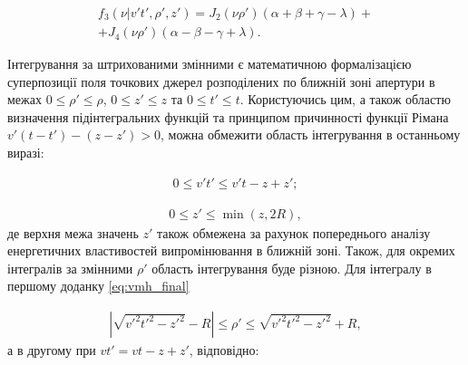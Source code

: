 \begin{equation} \begin{aligned}
f_3 ( \nu | v't', \rho', z') = 
J_2 (\nu \rho') (\alpha + \beta + \gamma - \lambda) + \\
+ J_4 (\nu \rho') (\alpha - \beta - \gamma + \lambda).
\end{aligned} \end{equation}

Інтегрування за штрихованими змінними є математичною формалізацією 
суперпозиції поля точкових джерел розподілених по ближній зоні апертури
в межах 
$ 0 \leq \rho' \leq \rho $, $ 0 \leq z' \leq z $ та $ 0 \leq t' \leq t $. 
Користуючись цим, а також областю визначення підінтегральних функцій та 
принципом причинності функції Рімана $ v'(t-t')-(z-z') > 0 $, можна обмежити 
область інтегрування в останньому виразі:

\begin{equation} \begin{aligned}
0 \leq v't' \leq v't - z + z';
\end{aligned} \end{equation}

\begin{equation} \begin{aligned}
0 \leq z' \leq \min(z,2R),
\end{aligned} \end{equation}
%
де верхня межа значень $ z' $ також обмежена за рахунок попереднього аналізу 
енергетичних властивостей випромінювання в ближній зоні. Також, для окремих 
інтегралів за змінними $ \rho' $ область інтегрування буде різною. Для 
інтегралу в першому доданку \eqref{eq:vmh_final}

\begin{equation} \begin{aligned}
\left| \sqrt{v'^2t'^2 - z'^2} - R \right| \leq \rho' \leq 
\sqrt{v'^2t'^2 - z'^2} + R,
\end{aligned} \end{equation}
%
а в другому при $ vt' = vt - z + z' $, відповідно:


